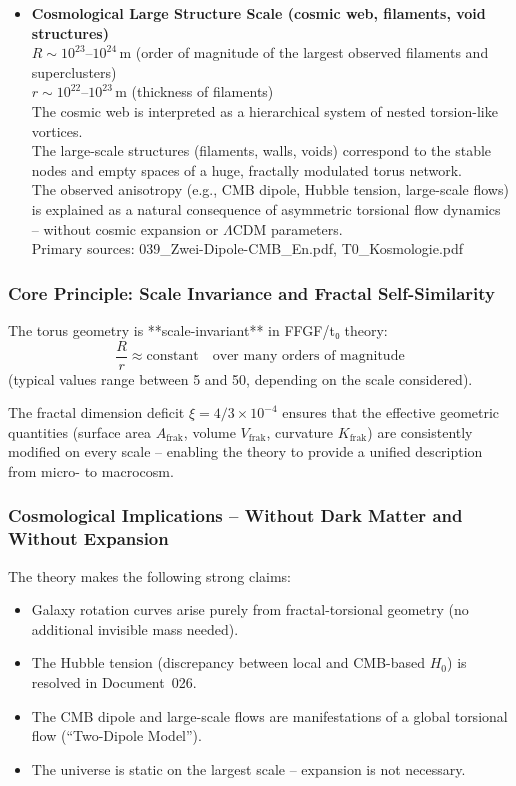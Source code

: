 \begin{itemize}
	\item \textbf{Cosmological Large Structure Scale (cosmic web, filaments, void structures)} \\
	$R \sim 10^{23}$–$10^{24}\,\text{m}$ (order of magnitude of the largest observed filaments and superclusters) \\
	$r \sim 10^{22}$–$10^{23}\,\text{m}$ (thickness of filaments) \\
	The cosmic web is interpreted as a hierarchical system of nested torsion-like vortices. \\
	The large-scale structures (filaments, walls, voids) correspond to the stable nodes and empty spaces of a huge, fractally modulated torus network. \\
	The observed anisotropy (e.g., CMB dipole, Hubble tension, large-scale flows) is explained as a natural consequence of asymmetric torsional flow dynamics – without cosmic expansion or $\Lambda$CDM parameters. \\
	Primary sources: 039\_Zwei-Dipole-CMB\_En.pdf, T0\_Kosmologie.pdf
\end{itemize}

\subsubsection{Core Principle: Scale Invariance and Fractal Self-Similarity}

The torus geometry is **scale-invariant** in FFGF/t₀ theory:
\[
\frac{R}{r} \approx \text{constant} \quad \text{over many orders of magnitude}
\]
(typical values range between 5 and 50, depending on the scale considered).

The fractal dimension deficit $\xi = 4/3 \times 10^{-4}$ ensures that the effective geometric quantities (surface area $A_{\text{frak}}$, volume $V_{\text{frak}}$, curvature $K_{\text{frak}}$) are consistently modified on every scale – enabling the theory to provide a unified description from micro- to macrocosm.

\subsubsection{Cosmological Implications – Without Dark Matter and Without Expansion}

The theory makes the following strong claims:
\begin{itemize}
	\item Galaxy rotation curves arise purely from fractal-torsional geometry (no additional invisible mass needed).
	\item The Hubble tension (discrepancy between local and CMB-based $H_0$) is resolved in Document~026.
	\item The CMB dipole and large-scale flows are manifestations of a global torsional flow (``Two-Dipole Model'').
	\item The universe is static on the largest scale – expansion is not necessary.
\end{itemize}

